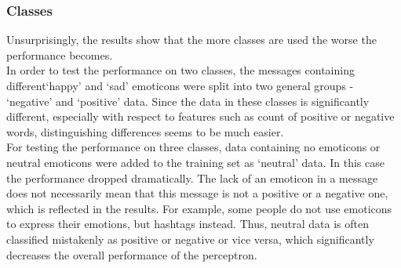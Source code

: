 \begin{comment}
\begin{table}[h!]
\begin{center}
\begin{tabular}{| c | c | c | c | c | c | c |}
\hline
 {\textbf{Classes}} 			& {\textbf{Features}} 
 & {\textbf{Data per class}} 					& {\textbf{Iterations}} 
 & {\textbf{Train Accuracy}} 					& {\textbf{Test Accuracy}} 
 \\
\hline
2 			& all 				& 500 		& 50			& ?			& ? 			\\
2 			& subset 		& 500 		& 50			& ?			& ? 			\\
3 			& all 				& 500 		& 50			& ?			& ? 			\\
3 			& subset 		& 500 		& 50			& ?			& ? 			\\
15 		& all		 		& 500 		& 50			& ?			& ? 			\\
15 		& subset 		& 500 		& 50			& ?			& ? 			\\
\hline
\end{tabular}
\caption{AMP accuracy}
\label{table:AMPaccuracy}
\end{center}
\end{table}
\end{comment}

\subsubsection*{Classes} 
Unsurprisingly, the results show that the more classes are used the worse the performance becomes. \\

\noindent In order to test the performance on two classes, the messages containing different`happy' and `sad' emoticons were split into two general groups - `negative' and `positive' data. Since the data in these classes is significantly different, especially with respect to features such as count of positive or negative words, distinguishing differences seems to be much easier. \\

\noindent For testing the performance on three classes, data containing no emoticons or neutral emoticons were added to the training set as `neutral' data. In this case the performance dropped dramatically. The lack of an emoticon in a message does not necessarily mean that this message is not a positive or a negative one, which is reflected in the results. For example, some people do not use emoticons to express their emotions, but hashtags instead. Thus, neutral data is often classified mistakenly as positive or negative or vice versa, which significantly decreases the overall performance of the perceptron. \\

